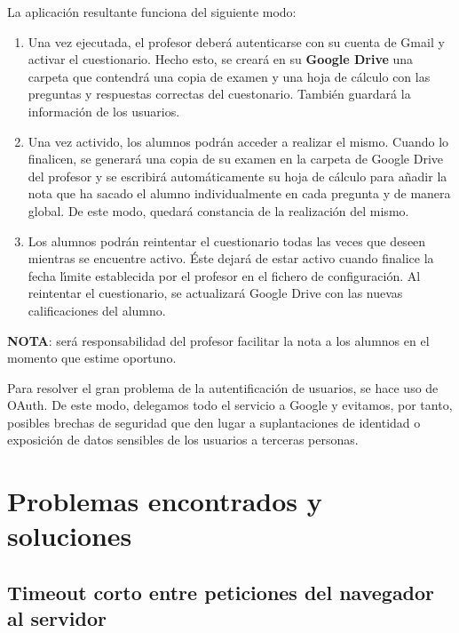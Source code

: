La aplicaci\'on resultante funciona del siguiente modo:
\begin{enumerate}
  \item Una vez ejecutada, el profesor deber\'a autenticarse con su cuenta de Gmail y activar el cuestionario. Hecho esto, se crear\'a en su {\bfseries Google Drive} 
  una carpeta que contendr\'a una copia de examen y una hoja de c\'alculo con las preguntas y respuestas correctas del cuestonario. Tambi\'en guardar\'a la informaci\'on
  de los usuarios. 
  
  \item Una vez activido, los alumnos podr\'an acceder a realizar el mismo. Cuando lo finalicen, se generar\'a una copia de su examen en la carpeta de Google Drive del
  profesor y se escribir\'a autom\'aticamente su hoja de c\'alculo para a\~{n}adir la nota que ha sacado el alumno individualmente en cada pregunta y de manera global.
  De este modo, quedar\'a constancia de la realizaci\'on del mismo.
 
  \item Los alumnos podr\'an reintentar el cuestionario todas las veces que deseen mientras se encuentre activo. \'Este dejar\'a de estar activo cuando finalice la fecha 
  l\'{\i}mite establecida por el profesor en el fichero de configuraci\'on. Al reintentar el cuestionario, se actualizar\'a Google Drive con las nuevas calificaciones
  del alumno.
\end{enumerate}

{\bfseries NOTA}: ser\'a responsabilidad del profesor facilitar la nota a los alumnos en el momento que estime oportuno.
\bigskip

Para resolver el gran problema de la autentificaci\'on de usuarios, se hace uso de OAuth. De este modo, delegamos todo el servicio a Google y evitamos, por tanto,
posibles brechas de seguridad que den lugar a suplantaciones de identidad o exposici\'on de datos sensibles de los usuarios a terceras personas.
\bigskip


\section{Problemas encontrados y soluciones}
\label{5:sec:1}

\subsection{Timeout corto entre peticiones del navegador al servidor}
\label{subsec:4.1.1}
\bigskip

